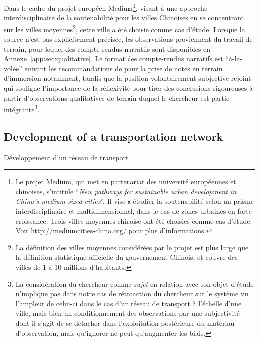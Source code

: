 {Dans le cadre du projet européen Medium\footnote{Le projet Medium, qui met en partenariat des université européennes et chinoises, s'intitule ``\textit{New pathways for sustainable urban development in China’s medium-sized cities}''. Il vise à étudier la soutenabilité selon un prisme interdisciplinaire et multidimensionnel, dans le cas de zones urbaines en forte croissance. Trois villes moyennes chinoise ont été choisies comme cas d'étude. Voir \url{http://mediumcities-china.org/} pour plus d'informations.}, visant à une approche interdisciplinaire de la soutenabilité pour les villes Chinoises en se concentrant sur les villes moyennes\footnote{La définition des villes moyennes considérées par le projet est plus large que la définition statistique officielle du gouvernement Chinois, et couvre des villes de 1 à 10 millions d'habitants.}, cette ville a été choisie comme cas d'étude. Lorsque la source n'est pas explicitement précisée, les observations proviennent du travail de terrain, pour lequel des compte-rendus narratifs sont disponibles en Annexe~\ref{app:sec:qualitative}. Le format des compte-rendus narratifs est ``à-la-volée'' suivant les recommandations de \cite{goffman1989fieldwork} pour la prise de notes en terrain d'immersion notamment, tandis que la position volontairement subjective rejoint \cite{ball1990self} qui souligne l'importance de la réflexivité pour tirer des conclusions rigoureuses à partir d'observations qualitatives de terrain duquel le chercheur est partie intégrante\footnote{La considération du chercheur comme \emph{sujet} en relation avec son objet d'étude n'implique pas dans notre cas de rétroaction du chercheur sur le système vu l'ampleur de celui-ci dans le cas d'un réseau de transport à l'échelle d'une ville, mais bien un conditionnement des observations par une subjectivité dont il s'agit de se détacher dans l'exploitation postérieure du matériau d'observation, mais qu'ignorer ne peut qu'augmenter les biais.}.
}







\subsection{Development of a transportation network}{Développement d'un réseau de transport}




